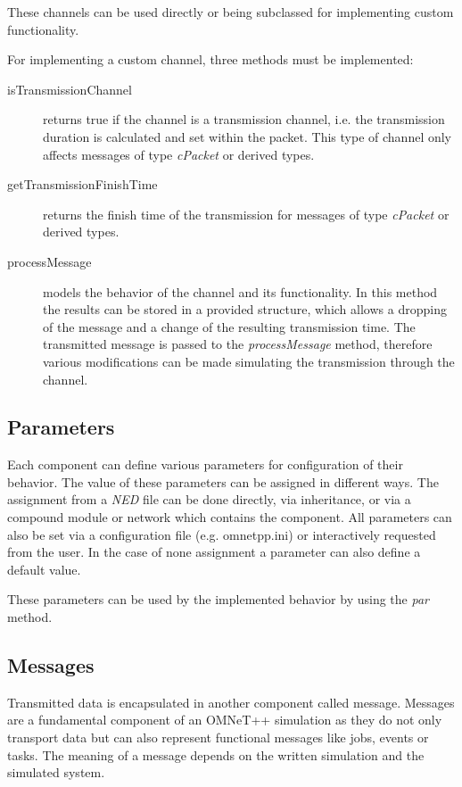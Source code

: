 These channels can be used directly or being subclassed for implementing custom functionality. \cite[section 3.5]{omnet_manual}

For implementing a custom channel, three methods must be implemented:

\begin{description}
    \item[isTransmissionChannel] returns true if the channel is a transmission channel, i.e. the transmission duration is calculated and set within the packet.
    This type of channel only affects messages of type \emph{cPacket} or derived types.
    \item[getTransmissionFinishTime] returns the finish time of the transmission for messages of type \emph{cPacket} or derived types.
    \item[processMessage] models the behavior of the channel and its functionality.
    In this method the results can be stored in a provided structure, which allows a dropping of the message and a change of the resulting transmission time.
    The transmitted message is passed to the \emph{processMessage} method, therefore various modifications can be made simulating the transmission through the channel. \cite[section 4.8]{omnet_manual}
\end{description}

\subsection{Parameters}
\label{sec:omnet_components_parameters}
Each component can define various parameters for configuration of their behavior.
The value of these parameters can be assigned in different ways.
The assignment from a \emph{NED} file can be done directly, via inheritance, or via a compound module or network which contains the component.
All parameters can also be set via a configuration file (e.g. omnetpp.ini) or interactively requested from the user.
In the case of none assignment a parameter can also define a default value.

These parameters can be used by the implemented behavior by using the \emph{par} method. \cite[section 3.6]{omnet_manual}

\subsection{Messages}
\label{sec:omnet_components_messages}
Transmitted data is encapsulated in another component called message.
Messages are a fundamental component of an OMNeT++ simulation as they do not only transport data but can also represent functional messages like jobs, events or tasks.
The meaning of a message depends on the written simulation and the simulated system. \cite[chapter 5]{omnet_manual}

